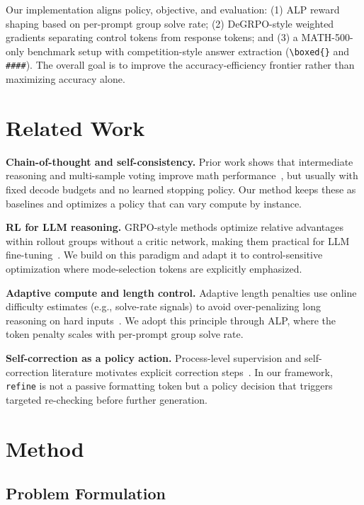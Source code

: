 \documentclass{article}
\begin{document}
Our implementation aligns policy, objective, and evaluation: (1) ALP reward shaping based on per-prompt group solve rate; (2) DeGRPO-style weighted gradients separating control tokens from response tokens; and (3) a MATH-500-only benchmark setup with competition-style answer extraction (\texttt{\textbackslash boxed\{\}} and \texttt{\#\#\#\#}). The overall goal is to improve the accuracy-efficiency frontier rather than maximizing accuracy alone.

\section{Related Work}

\textbf{Chain-of-thought and self-consistency.} Prior work shows that intermediate reasoning and multi-sample voting improve math performance~\citep{wei2022chainofthought,wang2023selfconsistency}, but usually with fixed decode budgets and no learned stopping policy. Our method keeps these as baselines and optimizes a policy that can vary compute by instance.

\textbf{RL for LLM reasoning.} GRPO-style methods optimize relative advantages within rollout groups without a critic network, making them practical for LLM fine-tuning~\citep{shao2024deepseekmath}. We build on this paradigm and adapt it to control-sensitive optimization where mode-selection tokens are explicitly emphasized.

\textbf{Adaptive compute and length control.} Adaptive length penalties use online difficulty estimates (e.g., solve-rate signals) to avoid over-penalizing long reasoning on hard inputs~\citep{snell2024scaling}. We adopt this principle through ALP, where the token penalty scales with per-prompt group solve rate.

\textbf{Self-correction as a policy action.} Process-level supervision and self-correction literature motivates explicit correction steps~\citep{lightman2023lets,zhang2025lessons,kumar2024score}. In our framework, \texttt{refine} is not a passive formatting token but a policy decision that triggers targeted re-checking before further generation.

\section{Method}

\subsection{Problem Formulation}
\end{document}
